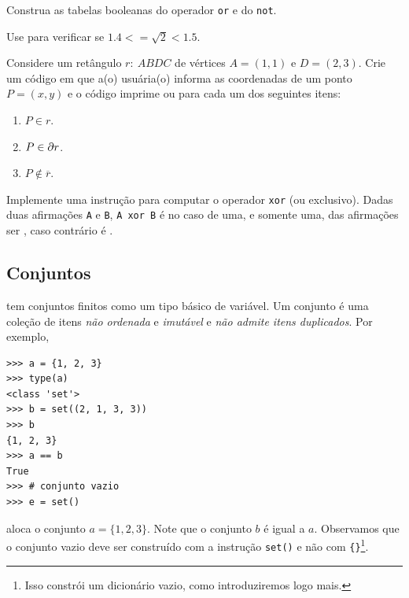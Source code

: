\documentclass[12pt]{article}
\begin{document}
\begin{exr}
  Construa as tabelas booleanas do operador \texttt{or} e do \texttt{not}.
\end{exr}

\begin{exr}
  Use {\python} para verificar se $1.4 <= \sqrt{2} < 1.5$.
\end{exr}

\begin{exr}
  Considere um retângulo $r: ~ABDC$ de vértices $A = (1, 1)$ e $D = (2, 3)$. Crie um código em que a(o) usuária(o) informa as coordenadas de um ponto $P = (x, y)$ e o código imprime {\PYTHONTrue} ou {\PYTHONFalse} para cada um dos seguintes itens:
  \begin{enumerate}
  \item $P\in r$.
  \item $P\in \partial r$.
  \item $P\not\in \overline{r}$.
  \end{enumerate}
\end{exr}

\begin{exr}
  Implemente uma instrução para computar o operador \texttt{xor} (ou exclusivo). Dadas duas afirmações \texttt{A} e \texttt{B}, \texttt{A xor B} é {\PYTHONTrue} no caso de uma, e somente uma, das afirmações ser {\PYTHONFalse}, caso contrário é {\PYTHONFalse}.
\end{exr}


\subsection{Conjuntos}

{\python} tem conjuntos finitos como um tipo básico de variável. Um conjunto é uma coleção de itens \emph{não ordenada} e \emph{imutável} e \emph{não admite itens duplicados}. Por exemplo,

\begin{lstlisting}
>>> a = {1, 2, 3}
>>> type(a)
<class 'set'>
>>> b = set((2, 1, 3, 3))
>>> b
{1, 2, 3}
>>> a == b
True
>>> # conjunto vazio
>>> e = set()
\end{lstlisting}

aloca o conjunto $a = \{1,2, 3\}$. Note que o conjunto $b$ é igual a $a$. Observamos que o conjunto vazio deve ser construído com a instrução \lstinline+set()+ e não com \lstinline+{}+\footnote{Isso constrói um dicionário vazio, como introduziremos logo mais.}.
\end{document}

